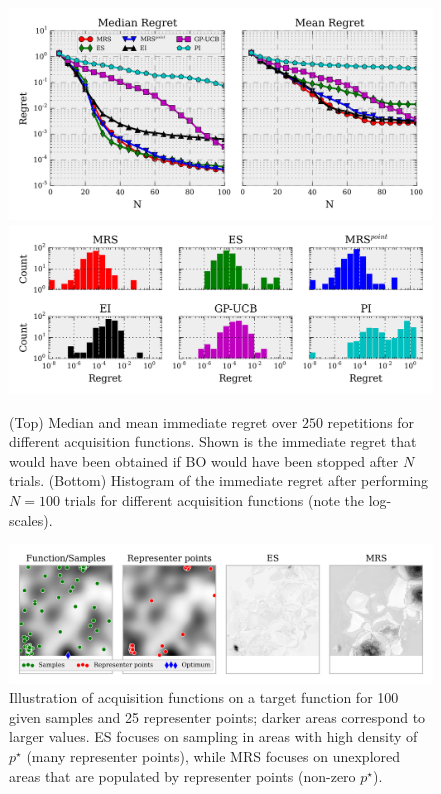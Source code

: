 \documentclass[10pt,letterpaper]{article} %
\begin{document}
\begin{figure}
\centering
\includegraphics[width=.9\textwidth]{empirical_comparison}
\includegraphics[width=.9\textwidth]{hist}
\caption{(Top) Median and mean immediate regret over $250$ repetitions for different acquisition functions. Shown is the immediate regret that would have been obtained if BO would have been stopped after $N$ trials.
 (Bottom) Histogram of the immediate regret after performing $N=100$ trials for different acquisition functions (note the log-scales).}
\label{fig:empirical_comparison}
\end{figure}

\begin{figure}
\centering
\includegraphics[width=.9\textwidth]{es_analysis}
\caption{Illustration of acquisition functions on a target function for
100 given samples and 25 representer points; darker areas correspond to larger values. ES focuses on sampling in areas with high density of $p^\star$ (many representer points), while MRS focuses on unexplored areas that are populated by representer points (non-zero $p^\star$).
}
\label{fig:es_analysis}
\end{figure}
\end{document}
